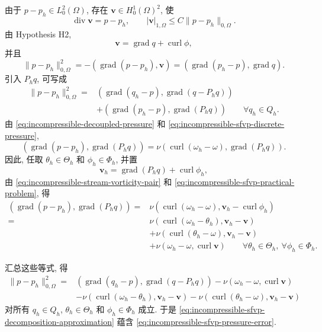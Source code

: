\begin{Proof}
由于 $p-p_h\in L_0^2(\Omega)$, 存在
$\mathbf v\in H_0^1(\Omega)^2$, 使
\[
\operatorname{div}\mathbf v=p-p_h,
\qquad
|\mathbf v|_{1,\Omega}
\leq C\|p-p_h\|_{0,\Omega}.
\]
由 Hypothesis H2,
\[
\mathbf v=\operatorname{grad}q+\operatorname{curl}\phi,
\]
并且
\[
\|p-p_h\|_{0,\Omega}^2
=-(\operatorname{grad}(p-p_h),\mathbf v)
=(\operatorname{grad}(p_h-p),\operatorname{grad}q).
\]
引入 $P_hq$, 可写成
\[
\begin{split}
\|p-p_h\|_{0,\Omega}^2
={}&(\operatorname{grad}(q_h-p),
\operatorname{grad}(q-P_hq))\\
&+(\operatorname{grad}(p_h-p),
\operatorname{grad}(P_hq))
\qquad\forall q_h\in Q_h.
\end{split}
\]
由 \eqref{eq:incompressible-decoupled-pressure}
和 \eqref{eq:incompressible-sfvp-discrete-pressure},
\[
(\operatorname{grad}(p-p_h),\operatorname{grad}(P_hq))
=\nu(\operatorname{curl}(\omega_h-\omega),
\operatorname{grad}(P_hq)).
\]
因此, 任取 $\theta_h\in\Theta_h$ 和 $\phi_h\in\Phi_h$,
并置
\[
\mathbf v_h=\operatorname{grad}(P_hq)+\operatorname{curl}\phi_h,
\]
由 \eqref{eq:incompressible-stream-vorticity-pair}
和 \eqref{eq:incompressible-sfvp-practical-problem}, 得
\[
\begin{split}
(\operatorname{grad}(p-p_h),\operatorname{grad}(P_hq))
={}&\nu(\operatorname{curl}(\omega_h-\omega),
\mathbf v_h-\operatorname{curl}\phi_h)\\
={}&\nu(\operatorname{curl}(\omega_h-\theta_h),
\mathbf v_h-\mathbf v)\\
&+\nu(\operatorname{curl}(\theta_h-\omega),
\mathbf v_h-\mathbf v)\\
&+\nu(\omega_h-\omega,\operatorname{curl}\mathbf v)
\qquad\forall\theta_h\in\Theta_h,
\ \forall\phi_h\in\Phi_h.
\end{split}
\]

汇总这些等式, 得
\[
\begin{split}
\|p-p_h\|_{0,\Omega}^2
={}&(\operatorname{grad}(q_h-p),
\operatorname{grad}(q-P_hq))
-\nu(\omega_h-\omega,\operatorname{curl}\mathbf v)\\
&-\nu(\operatorname{curl}(\omega_h-\theta_h),
\mathbf v_h-\mathbf v)
-\nu(\operatorname{curl}(\theta_h-\omega),
\mathbf v_h-\mathbf v)
\end{split}
\]
对所有 $q_h\in Q_h$, $\theta_h\in\Theta_h$
和 $\phi_h\in\Phi_h$ 成立.
于是 \eqref{eq:incompressible-sfvp-decomposition-approximation}
蕴含 \eqref{eq:incompressible-sfvp-pressure-error}.
\end{Proof}


